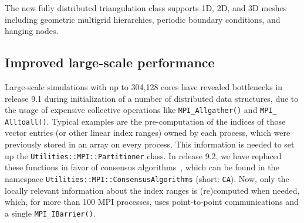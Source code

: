 \documentclass{ansarticle-preprint}
\begin{document}


The new fully distributed triangulation class supports 1D, 2D, and 3D meshes
including geometric multigrid hierarchies, periodic boundary conditions, and
hanging nodes.




\subsection{Improved large-scale performance}
\label{subsec:performance}

Large-scale simulations with up to 304,128 cores have revealed bottlenecks in release
9.1 during initialization of a number of distributed data structures, due to the usage of expensive collective operations
like \texttt{MPI\_Allgather()} and \texttt{MPI\_\allowbreak
  Alltoall()}. Typical examples are the
pre-computation of the indices of those vector entries (or
other linear index ranges) owned by
each process, which were previously stored in  an array on every process.
This information is needed to set up
the  \texttt{Utilities::MPI::Par\-ti\-ti\-oner} class.
In release 9.2, we have replaced these functions in favor of
consensus algorithms~\cite{hoefler2010scalable}, which can be
found in the namespace \texttt{Utilities::\allowbreak MPI::\allowbreak ConsensusAlgorithms} (short: \texttt{CA}).
Now, only the locally relevant information about the index ranges is
(re)computed when needed, which, for more than 100 MPI processes, uses
point-to-point communications and a single \texttt{MPI\_IBarrier()}.
\end{document}
